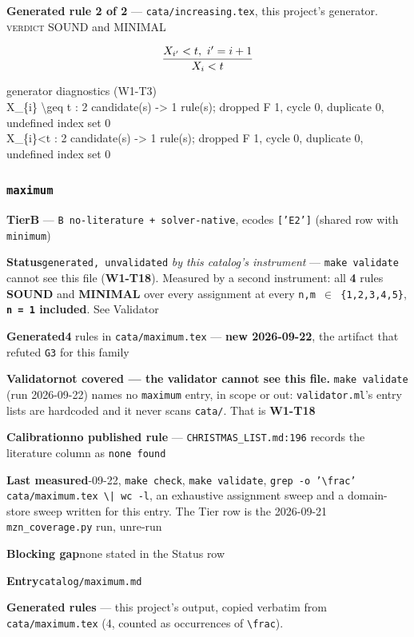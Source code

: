 \documentclass[10pt,a4paper]{article}
\newcommand{\entryfield}[2]{{\raggedright\textbf{#1}\quad #2\par}}
\newcommand{\diag}[1]{{\small\itshape\raggedright #1\par}}
\newcommand{\rulebox}[1]{%
  \[\resizebox{\ifdim\width>\linewidth\linewidth\else\width\fi}{!}%
    {$\displaystyle #1$}\]}
\begin{document}
{\small\textbf{Generated rule 2 of 2} --- \texttt{cata/increasing.tex}, this project's generator. \textsc{verdict} SOUND and MINIMAL\par}
\rulebox{\frac{X_{i'}<t,~i'=i+1}{X_{i}<t}}

\diag{generator diagnostics (W1-T3)\\{} X\_\{i\} \textbackslash{}geq t : 2 candidate(s) -> 1 rule(s); dropped F 1, cycle 0, duplicate 0, undefined index set 0\\{} X\_\{i\}<t : 2 candidate(s) -> 1 rule(s); dropped F 1, cycle 0, duplicate 0, undefined index set 0}
\subsubsection*{\texttt{maximum}}
\label{entry:maximum}
\entryfield{Tier}{\textbf{B} --- \texttt{B no-\allowbreak{}literature + solver-\allowbreak{}native}, ecodes \texttt{['E2']} (shared row with \texttt{minimum})}
\entryfield{Status}{\texttt{generated, unvalidated} \emph{by this catalog's instrument} --- \texttt{make validate} cannot see this file (\textbf{W1-T18}). Measured by a second instrument: all \textbf{4} rules \textbf{SOUND} and \textbf{MINIMAL} over every assignment at every \texttt{n,m $\in$ \{1,2,3,4,5\}}, \textbf{\texttt{n = 1} included}. See Validator}
\entryfield{Generated}{\textbf{4} rules in \texttt{cata/maximum.tex} --- \textbf{new 2026-09-22}, the artifact that refuted \texttt{G3} for this family}
\entryfield{Validator}{\textbf{not covered --- the validator cannot see this file.} \texttt{make validate} (run 2026-09-22) names no \texttt{maximum} entry, in scope or out: \texttt{validator.ml}'s entry lists are hardcoded and it never scans \texttt{cata/}. That is \textbf{W1-T18}}
\entryfield{Calibration}{\textbf{no published rule} --- \texttt{CHRISTMAS\_LIST.md:196} records the literature column as \texttt{none found}}
\entryfield{Last measured}{2026-09-22, \texttt{make check}, \texttt{make validate}, \texttt{grep -\allowbreak{}o '\textbackslash{}frac' cata/\allowbreak{}maximum.\allowbreak{}tex \textbackslash{}| wc -\allowbreak{}l}, an exhaustive assignment sweep and a domain-store sweep written for this entry. The Tier row is the 2026-09-21 \texttt{mzn\_coverage.py} run, unre-run}
\entryfield{Blocking gap}{none stated in the Status row}
\entryfield{Entry}{\texttt{catalog/maximum.md}}

\textbf{Generated rules} --- this project's output, copied verbatim from \texttt{cata/maximum.tex} (4, counted as occurrences of \texttt{\textbackslash{}frac}).\par
\end{document}
